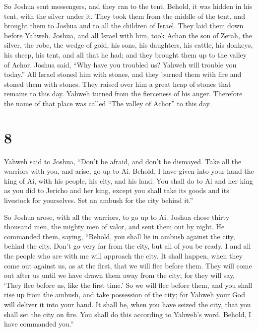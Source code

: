  So Joshua sent messengers, and they ran to the tent.
Behold, it was hidden in his tent, with the silver under it.
 They took them from the middle of the tent, and brought
them to Joshua and to all the children of Israel. They laid them down
before Yahweh.  Joshua, and all Israel with him, took Achan
the son of Zerah, the silver, the robe, the wedge of gold, his sons, his
daughters, his cattle, his donkeys, his sheep, his tent, and all that he
had; and they brought them up to the valley of Achor. 
Joshua said, ``Why have you troubled us? Yahweh will trouble you
today.'' All Israel stoned him with stones, and they burned them with
fire and stoned them with stones.  They raised over him a
great heap of stones that remains to this day. Yahweh turned from the
fierceness of his anger. Therefore the name of that place was called
``The valley of Achor'' to this day.

\hypertarget{section-7}{%
\section{8}\label{section-7}}

 Yahweh said to Joshua, ``Don't be afraid, and don't be
dismayed. Take all the warriors with you, and arise, go up to Ai.
Behold, I have given into your hand the king of Ai, with his people, his
city, and his land.  You shall do to Ai and her king as you
did to Jericho and her king, except you shall take its goods and its
livestock for yourselves. Set an ambush for the city behind it.''

 So Joshua arose, with all the warriors, to go up to Ai.
Joshua chose thirty thousand men, the mighty men of valor, and sent them
out by night.  He commanded them, saying, ``Behold, you
shall lie in ambush against the city, behind the city. Don't go very far
from the city, but all of you be ready.  I and all the
people who are with me will approach the city. It shall happen, when
they come out against us, as at the first, that we will flee before
them.  They will come out after us until we have drawn them
away from the city; for they will say, `They flee before us, like the
first time.' So we will flee before them,  and you shall
rise up from the ambush, and take possession of the city; for Yahweh
your God will deliver it into your hand.  It shall be, when
you have seized the city, that you shall set the city on fire. You shall
do this according to Yahweh's word. Behold, I have commanded you.''

